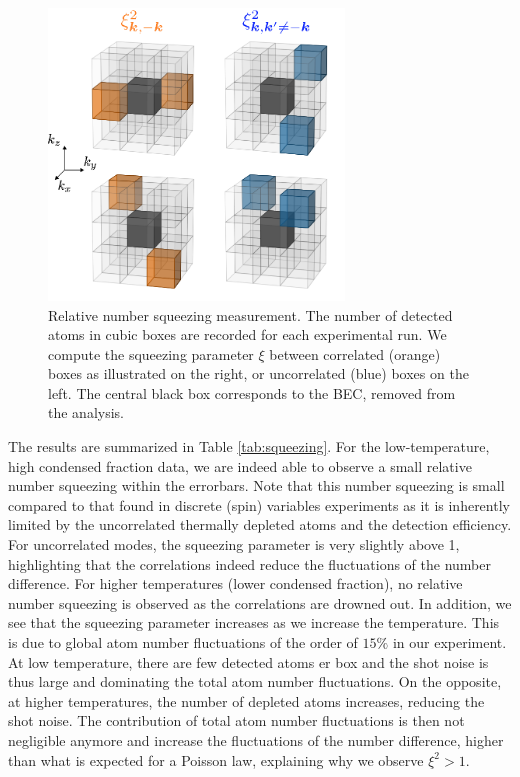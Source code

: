 \begin{figure}
    \centering
    \includegraphics[width=0.7\textwidth]{Fig/Chapter4/squeezing.png}
    \caption[Relative number squeezing measurement]{Relative number squeezing measurement. The number of detected atoms in cubic boxes are recorded for each experimental run. We compute the squeezing parameter $\xi$ between correlated (orange) boxes as illustrated on the right, or uncorrelated (blue) boxes on the left. The central black box corresponds to the BEC, removed from the analysis.}
    \label{fig:squeezing}
\end{figure}

The results are summarized in Table \ref{tab:squeezing}. For the low-temperature, high condensed fraction data, we are indeed able to observe a small relative number squeezing within the errorbars. Note that this number squeezing is small compared to that found in discrete (spin) variables experiments \cite{bucker2011,esteve2008squeezing, pezze2018} as it is inherently limited by the uncorrelated thermally depleted atoms and the detection efficiency. For uncorrelated modes, the squeezing parameter is very slightly above 1, highlighting that the correlations indeed reduce the fluctuations of the number difference. For higher temperatures (lower condensed fraction), no relative number squeezing is observed as the correlations are drowned out. In addition, we see that the squeezing parameter increases as we increase the temperature. This is due to global atom number fluctuations of the order of $15\%$ in our experiment. At low temperature, there are few detected atoms er box and the shot noise is thus large and dominating the total atom number fluctuations. On the opposite, at higher temperatures, the number of depleted atoms increases, reducing the shot noise. The contribution of total atom number fluctuations is then not negligible anymore and increase the fluctuations of the number difference, higher than what is expected for a Poisson law, explaining why we observe $\xi^2 > 1$.

